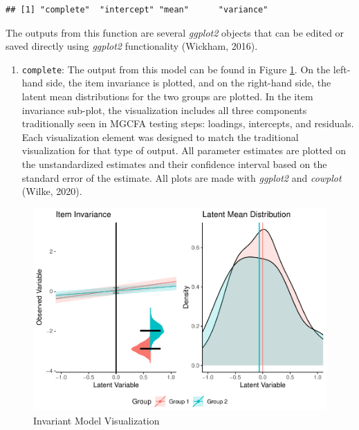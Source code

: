 \documentclass[
  man]{apa7}
\providecommand{\tightlist}{%
  \setlength{\itemsep}{0pt}\setlength{\parskip}{0pt}}
\begin{document}
\normalsize

\begin{verbatim}
## [1] "complete"  "intercept" "mean"      "variance"
\end{verbatim}

The outputs from this function are several \emph{ggplot2} objects that can be edited or saved directly using \emph{ggplot2} functionality (Wickham, 2016).

\begin{enumerate}
\def\labelenumi{\arabic{enumi})}
\tightlist
\item
  \texttt{complete}: The output from this model can be found in Figure \ref{fig:invariant-pic}. On the left-hand side, the item invariance is plotted, and on the right-hand side, the latent mean distributions for the two groups are plotted. In the item invariance sub-plot, the visualization includes all three components traditionally seen in MGCFA testing steps: loadings, intercepts, and residuals. Each visualization element was designed to match the traditional visualization for that type of output. All parameter estimates are plotted on the unstandardized estimates and their confidence interval based on the standard error of the estimate. All plots are made with \emph{ggplot2} and \emph{cowplot} (Wilke, 2020).
\end{enumerate}

\begin{figure}
\centering
\includegraphics{manuscript_files/figure-latex/invariant-pic-1.pdf}
\caption{\label{fig:invariant-pic}Invariant Model Visualization}
\end{figure}
\end{document}

